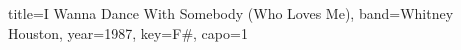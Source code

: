 \documentclass{bekki-leadsheet}
\begin{document}
\begin{song}[transpose-capo=true]{title={I Wanna Dance With Somebody (Who Loves Me)}, band={Whitney Houston}, year={1987}, key={F#}, capo={1}}



\end{song}
\end{document}
